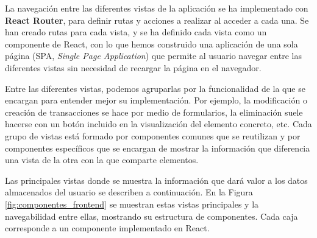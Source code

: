 La navegación entre las diferentes vistas de la aplicación se ha implementado con \textbf{React Router}, para definir rutas y acciones a realizar al acceder a cada una. Se han creado rutas para cada vista, y se ha definido cada vista como un componente de React, con lo que hemos construido una aplicación de una sola página (SPA, \textit{Single Page Application}) que permite al usuario navegar entre las diferentes vistas sin necesidad de recargar la página en el navegador. 


Entre las diferentes vistas, podemos agruparlas por la funcionalidad de la que se encargan para entender mejor su implementación. Por ejemplo, la modificación o creación de transacciones se hace por medio de formularios, la eliminación suele hacerse con un botón incluido en la visualización del elemento concreto, etc. Cada grupo de vistas está formado por componentes comunes que se reutilizan y por componentes específicos que se encargan de mostrar la información que diferencia una vista de la otra con la que comparte elementos. 


Las principales vistas donde se muestra la información que dará valor a los datos almacenados del usuario se describen a continuación. En la Figura \ref{fig:componentes_frontend} se muestran estas vistas principales y la navegabilidad entre ellas, mostrando su estructura de componentes. Cada caja corresponde a un componente implementado en React.

